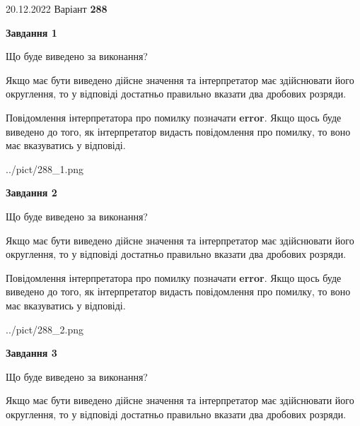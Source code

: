 \documentclass[12pt, ukrainian]{article}
\begin{document}
{20.12.2022 Варіант \No \textbf { 288 }\par}
{
\begin {Large}

{\begin {center}\textbf{Завдання 1}\end {center}}\par
Що буде виведено за виконання? \par

Якщо має бути виведено дійсне значення та інтерпретатор має здійснювати його округлення, 
то у відповіді достатньо правильно вказати два дробових розряди.

Повідомлення інтерпретатора про помилку позначати \textbf{error}.
Якщо щось буде виведено до того, як інтерпретатор видасть повідомлення про помилку, 
то воно має вказуватись у відповіді. \par

\begin{center}
	{../pict/288_1.png}
\end{center}
\newpage

{\begin {center}\textbf{Завдання 2}\end {center}}\par
Що буде виведено за виконання? \par

Якщо має бути виведено дійсне значення та інтерпретатор має здійснювати його округлення, 
то у відповіді достатньо правильно вказати два дробових розряди.

Повідомлення інтерпретатора про помилку позначати \textbf{error}.
Якщо щось буде виведено до того, як інтерпретатор видасть повідомлення про помилку, 
то воно має вказуватись у відповіді. \par

\begin{center}
	{../pict/288_2.png}
\end{center}
\newpage

{\begin {center}\textbf{Завдання 3}\end {center}}\par
Що буде виведено за виконання? \par

Якщо має бути виведено дійсне значення та інтерпретатор має здійснювати його округлення, 
то у відповіді достатньо правильно вказати два дробових розряди.


\end{Large}}
\end{document}
